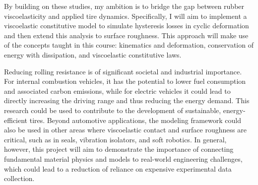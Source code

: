 By building on these studies, my ambition is to bridge the gap between rubber viscoelasticity and applied tire dynamics. Specifically, I will aim to implement a viscoelastic constitutive model to simulate hysteresis losses in cyclic deformation and then extend this analysis to surface roughness. This approach will make use of the concepts taught in this course: kinematics and deformation, conservation of energy with dissipation, and viscoelastic constitutive laws. 

Reducing rolling resistance is of significant societal and industrial importance. For internal combustion vehicles, it has the potential to lower fuel consumption and associated carbon emissions, while for electric vehicles it could lead to directly increasing the driving range and thus reducing the energy demand. This research could be used to contribute to the development of sustainable, energy-efficient tires. Beyond automotive applications, the modeling framework could also be used in other areas where viscoelastic contact and surface roughness are critical, such as in seals, vibration isolators, and soft robotics. In general, however, this project will aim to demonstrate the importance of connecting fundamental material physics and models to real-world engineering challenges, which could lead to a reduction of reliance on expensive experimental data collection.